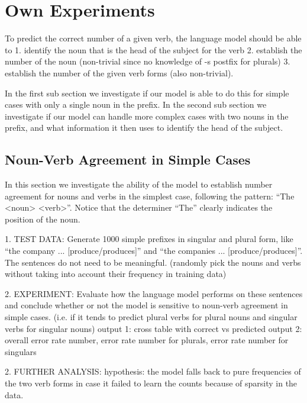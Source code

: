 \section{Own Experiments}
\label{own-experiments}

To predict the correct number of a given verb,
the language model should be able to
1. identify the noun that is the head of the subject for the verb
2. establish the number of the noun (non-trivial since no knowledge of -s postfix for plurals)
3. establish the number of the given verb forms (also non-trivial).

In the first sub section we investigate if our model is able to
do this for simple cases with only a single noun in the prefix.
%
In the second sub section we investigate if our model can handle
more complex cases with two nouns in the prefix,
and what information it then uses to identify the head of the subject.

\subsection{Noun-Verb Agreement in Simple Cases}

In this section we investigate the ability of the model to
establish number agreement for nouns and verbs in the simplest case,
following the pattern: ``The <noun> <verb>''. Notice that
the determiner ``The'' clearly indicates the position of the noun.

1. TEST DATA: 
Generate 1000 simple prefixes in singular and plural form, like ``the company ... [produce/produces]'' 
and ``the companies ... [produce/produces]''.
The sentences do not need to be meaningful.
(randomly pick the nouns and verbs without taking into account their frequency in training data)

2. EXPERIMENT: 
Evaluate how the language model performs on these sentences 
and conclude whether or not the model is sensitive to noun-verb agreement in simple cases. 
(i.e. if it tends to predict plural verbs for plural nouns and singular verbs for singular nouns)
output 1: cross table with correct vs predicted
output 2: overall error rate number, error rate number for plurals, error rate number for singulars 


2. FURTHER ANALYSIS:
hypothesis: the model falls back to pure frequencies of the two verb forms
in case it failed to learn the counts because of sparsity in the data.

